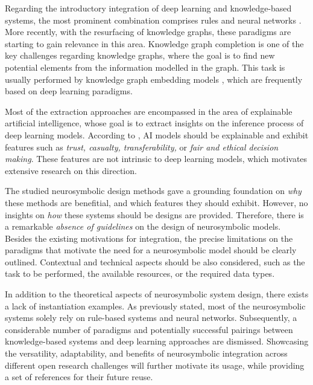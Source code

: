 Regarding the introductory integration of deep learning and knowledge-based systems, the most prominent combination comprises rules and neural networks \citep{daniele_knowledge_2019,hatzilygeroudis_integrated_2010}. More recently, with the resurfacing of knowledge graphs, these paradigms are starting to gain relevance in this area. Knowledge graph completion \citep{nickel_review_ml_kg_2016,wang_kge_survey_2017} is one of the key challenges regarding knowledge graphs, where the goal is to find new potential elements from the information modelled in the graph. This task is usually performed by knowledge graph embedding models \citep{transe,distmult,crosse}, which are frequently based on deep learning paradigms. 

Most of the extraction approaches are encompassed in the area of explainable artificial intelligence, whose goal is to extract insights on the inference process of deep learning models. According to \cite{burkart_survey_2021}, AI models should be explainable and exhibit features such as \textit{trust, casualty, transferability,} or \textit{fair and ethical decision making}. These features are not intrinsic to deep learning models, which motivates extensive research on this direction.

The studied neurosymbolic design methods gave a grounding foundation on \textit{why} these methods are benefitial, and which features they should exhibit. However, no insights on \textit{how} these systems should be designs are provided. Therefore, there is a remarkable \textit{absence of guidelines} on the design of neurosymbolic models. Besides the existing motivations for integration, the precise limitations on the paradigms that motivate the need for a neurosymbolic model should be clearly outlined. Contextual and technical aspects should be also considered, such as the task to be performed, the available resources, or the required data types.

In addition to the theoretical aspects of neurosymbolic system design, there exists a lack of instantiation examples. As previously stated, most of the neurosymbolic systems solely rely on rule-based systems and neural networks. Subsequently, a considerable number of paradigms and potentially successful pairings between knowledge-based systems and deep learning approaches are dismissed. Showcasing the versatility, adaptability, and benefits of neurosymbolic integration across different open research challenges will further motivate its usage, while providing a set of references for their future reuse. 

